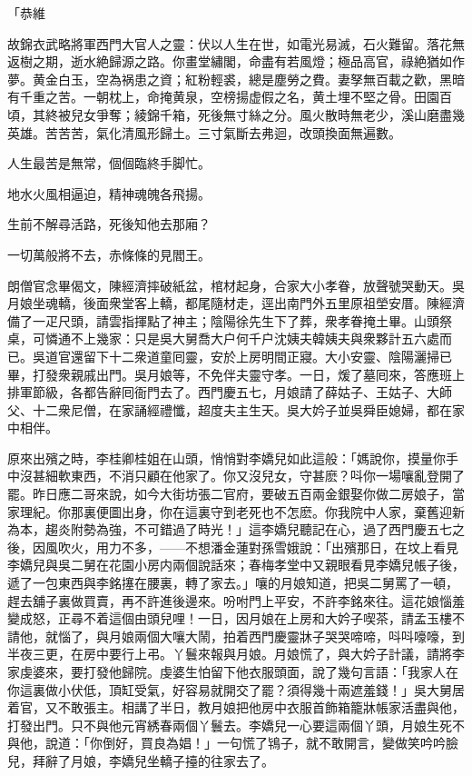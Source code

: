 \begin{myquote}
「恭維

故錦衣武略將軍西門大官人之靈：伏以人生在世，如電光易滅，石火難留。落花無返樹之期，逝水絶歸源之路。你畫堂繡閣，命盡有若風燈；極品高官，祿絶猶如作夢。黄金白玉，空為祸患之資；紅粉輕裘，總是塵勞之費。妻孥無百載之歡，黑暗有千重之苦。一朝枕上，命掩黄泉，空榜揚虚假之名，黄土埋不堅之骨。田園百頃，其終被兒女爭奪；綾錦千箱，死後無寸絲之分。風火散時無老少，溪山磨盡幾英雄。苦苦苦，氣化清風形歸土。三寸氣斷去弗迴，改頭換面無遍數。

{}

人生最苦是無常，個個臨終手脚忙。

地水火風相逼迫，精神魂魄各飛揚。

生前不解尋活路，死後知他去那廂？

一切萬般將不去，赤條條的見閻王。
\end{myquote}

朗僧官念畢偈文，陳經濟摔破紙盆，棺材起身，合家大小孝眷，放聲號哭動天。吳月娘坐魂轎，後面衆堂客上轎，都尾隨材走，逕出南門外五里原祖塋安厝。陳經濟備了一疋尺頭，請雲指揮點了神主；陰陽徐先生下了葬，衆孝眷掩土畢。山頭祭桌，可憐通不上幾家：只是吳大舅喬大户何千户沈姨夫韓姨夫與衆夥計五六處而已。吳道官還留下十二衆道童囘靈，安於上房明間正寢。大小安靈、陰陽灑掃已畢，打發衆親戚出門。吳月娘等，不免伴夫靈守孝。一日，煖了墓囘來，答應班上排軍節級，各都告辭囘衙門去了。西門慶五七，月娘請了薛姑子、王姑子、大師父、十二衆尼僧，在家誦經禮懺，超度夫主生天。吳大妗子並吳舜臣媳婦，都在家中相伴。

原來出殯之時，李桂卿桂姐在山頭，悄悄對李嬌兒如此這般：「媽說你，摸量你手中沒甚細軟東西，不消只顧在他家了。你又沒兒女，守甚麽？呌你一場嚷亂登開了罷。昨日應二哥來說，如今大街坊張二官府，要破五百兩金銀娶你做二房娘子，當家理紀。你那裏便圖出身，你在這裏守到老死也不怎麽。你我院中人家，棄舊迎新為本，趨炎附勢為強，不可錯過了時光！」這李嬌兒聽記在心，過了西門慶五七之後，因風吹火，用力不多，——不想潘金蓮對孫雪娥說：「出殯那日，在坟上看見李嬌兒與吳二舅在花園小房内兩個說話來；春梅孝堂中又親眼看見李嬌兒帳子後，遞了一包東西與李銘㩙在腰裏，轉了家去。」嚷的月娘知道，把吳二舅罵了一頓，趕去舖子裏做買賣，再不許進後邊來。吩咐門上平安，不許李銘來往。這花娘惱羞變成怒，正尋不着這個由頭兒哩！一日，因月娘在上房和大妗子喫茶，請孟玉樓不請他，就惱了，與月娘兩個大嚷大鬧，拍着西門慶靈牀子哭哭啼啼，呌呌嚎嚎，到半夜三更，在房中要行上弔。丫鬟來報與月娘。月娘慌了，與大妗子計議，請將李家虔婆來，要打發他歸院。虔婆生怕留下他衣服頭面，說了幾句言語：「我家人在你這裏做小伏低，頂缸受氣，好容易就開交了罷？須得幾十兩遮羞錢！」吳大舅居着官，又不敢張主。相講了半日，教月娘把他房中衣服首飾箱籠牀帳家活盡與他，打發出門。只不與他元宵綉春兩個丫鬟去。李嬌兒一心要這兩個丫頭，月娘生死不與他，說道：「你倒好，買良為娼！」一句慌了鴇子，就不敢開言，變做笑吟吟臉兒，拜辭了月娘，李嬌兒坐轎子擡的往家去了。

